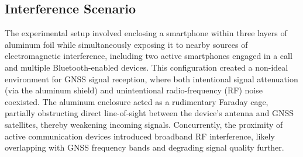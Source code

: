     \subsection{Interference Scenario}
    
        The experimental setup involved enclosing a smartphone within three layers of aluminum foil while simultaneously exposing it to nearby sources of electromagnetic interference, including two active smartphones engaged in a call and multiple Bluetooth-enabled devices. This configuration created a non-ideal environment for GNSS signal reception, where both intentional signal attenuation (via the aluminum shield) and unintentional radio-frequency (RF) noise coexisted. The aluminum enclosure acted as a rudimentary Faraday cage, partially obstructing direct line-of-sight between the device’s antenna and GNSS satellites, thereby weakening incoming signals. Concurrently, the proximity of active communication devices introduced broadband RF interference, likely overlapping with GNSS frequency bands and degrading signal quality further.